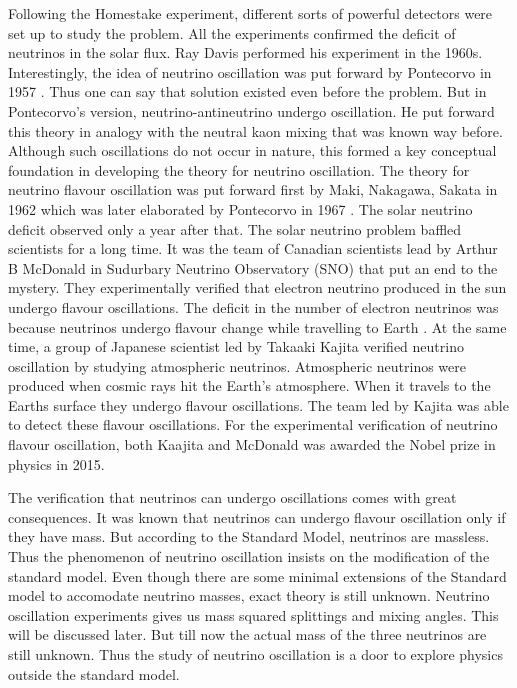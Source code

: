 \documentclass[12pt,a4paper]{report}
\begin{document}
Following the Homestake experiment, different sorts of powerful detectors were set up to study the problem. All the experiments confirmed the deficit of neutrinos in the solar flux. Ray Davis performed his experiment in the 1960s. Interestingly, the idea of neutrino oscillation was put forward by Pontecorvo in 1957 \cite{ponte57}. Thus one can say that solution existed even before the problem. But in Pontecorvo’s version, neutrino-antineutrino undergo oscillation. He put forward this theory in analogy with the neutral kaon mixing that was known way before. Although such oscillations do not occur in nature, this formed a key conceptual foundation in developing the theory for neutrino oscillation. The theory for neutrino flavour oscillation was put forward first by Maki, Nakagawa, Sakata in 1962 \cite{maki} which was later elaborated by Pontecorvo in 1967 \cite{ponte68}. The solar neutrino deficit observed only a year after that. The solar neutrino problem baffled scientists for a long time. It was the team of Canadian scientists lead by Arthur B McDonald in Sudurbary Neutrino Observatory (SNO) that put an end to the mystery. They experimentally verified that electron neutrino produced in the sun undergo flavour oscillations. The deficit in the number of electron neutrinos was because neutrinos undergo flavour change while travelling to Earth \cite{mcdonald}. At the same time, a group of Japanese scientist led by Takaaki Kajita verified neutrino oscillation by studying atmospheric neutrinos. Atmospheric neutrinos were produced when cosmic rays hit the Earth’s atmosphere. When it travels to the Earths surface they undergo flavour oscillations. The team led by Kajita was able to detect these flavour oscillations. For the experimental verification of neutrino flavour oscillation, both Kaajita and McDonald was awarded the Nobel prize in physics in 2015.

The verification that neutrinos can undergo oscillations comes with great consequences. It was known that neutrinos can undergo flavour oscillation only if they have mass. But according to the Standard Model, neutrinos are massless. Thus the phenomenon of neutrino oscillation insists on the modification of the standard model. Even though there are some minimal extensions of the Standard model to accomodate neutrino masses, exact theory is still unknown.  Neutrino oscillation experiments gives us mass squared splittings and mixing angles. This will be discussed later. But till now the actual mass of the three neutrinos are still unknown. Thus the study of neutrino oscillation is a door to explore physics outside the standard model. 
\end{document}
